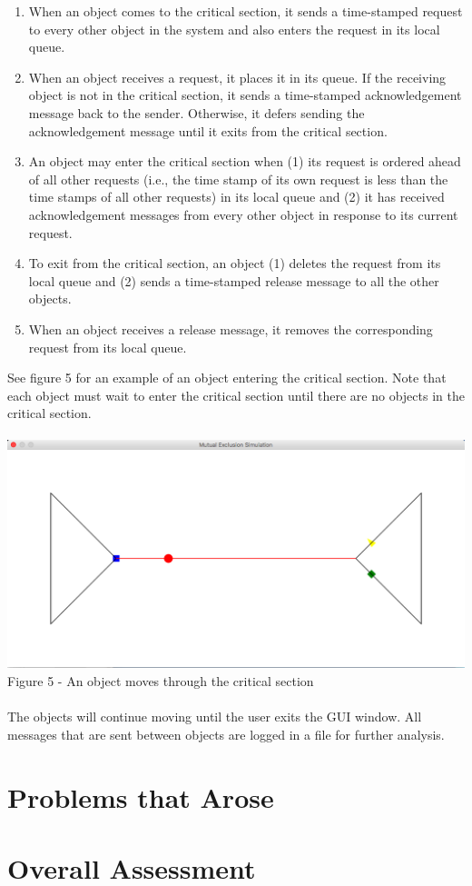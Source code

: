 \documentclass [11pt] {article}
\begin{document}
	\begin {enumerate}
		\item When an object comes to the critical section, it sends a time-stamped request to every other object in the system and also enters the request in its local queue.
		\item When an object receives a request, it places it in its queue.  If the receiving object is not in the critical section, it sends a time-stamped acknowledgement message back to the sender.  Otherwise, it defers sending the acknowledgement message until it exits from the critical section.
		\item An object may enter the critical section when (1) its request is ordered ahead of all other requests (i.e., the time stamp of its own request is less than the time stamps of all other requests) in its local queue and (2) it has received acknowledgement messages from every other object in response to its current request.
		\item To exit from the critical section, an object (1) deletes the request from its local queue and (2) sends a time-stamped release message to all the other objects.
		\item When an object receives a release message, it removes the corresponding request from its local queue.
	\end {enumerate}
	See figure 5 for an example of an object entering the critical section.  Note that each object must wait to enter the critical section until there are no objects in the critical section.\\\\ \includegraphics [scale = .5] {Figure5}\\ Figure 5 - An object moves through the critical section\\\\  The objects will continue moving until the user exits the GUI window.  All messages that are sent between objects are logged in a file for further analysis.  
	\section {Problems that Arose}
	\section {Overall Assessment}
\end{document}
